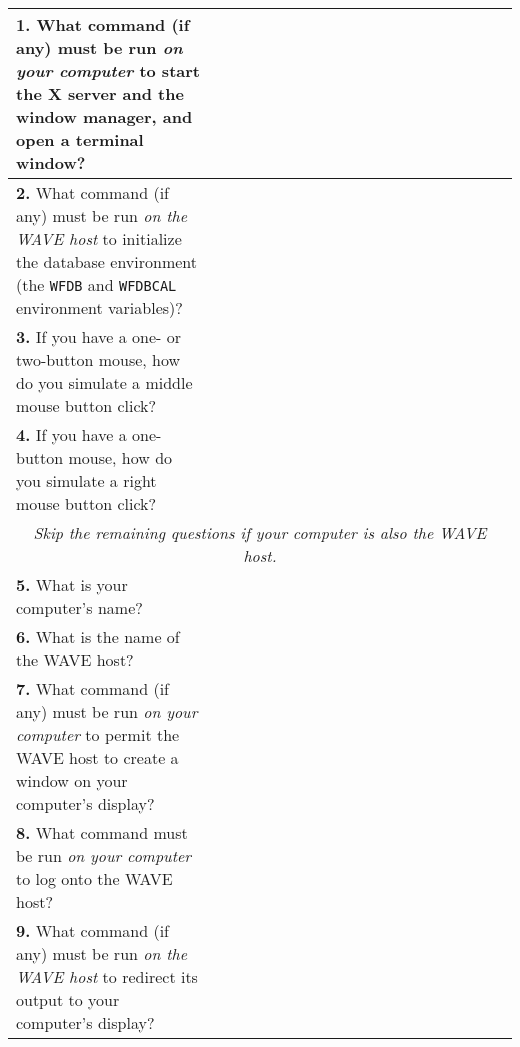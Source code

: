 \documentclass[twoside]{book}
\newcommand{\WAVE}{{\sf WAVE}\xspace}
\begin{document}
\noindent 
\begin{tabular*}{\textwidth}{|p{3 in}|r|}
\hline

{ {\bf 1.} What command (if any) must be run \emph{on your computer}
to start the X server and the window manager, and open a terminal window? } &
{~~~~~~~~~~~~~~~~~~~~~~~~~~~~~~~\,} \\
\hline

{ {\bf 2.} What command (if any) must be run \emph{on the \WAVE{} host} to
initialize the database environment (the {\tt WFDB} and {\tt WFDBCAL}
environment variables)?} &
{~~~~~~~~~~~~~~~~~~~~~~~~~~~~~~~\,} \\
\hline

{ {\bf 3.} If you have a one- or two-button mouse, how do you simulate a middle
mouse button click?} &
{~~~~~~~~~~~~~~~~~~~~~~~~~~~~~~~\,} \\
\hline

{ {\bf 4.} If you have a one-button mouse, how do you simulate a right mouse
button click?} &
{~~~~~~~~~~~~~~~~~~~~~~~~~~~~~~~\,} \\
\hline

\multicolumn{2}{c}{\emph{Skip the remaining questions if your computer is
also the \WAVE{} host.}} \\
\hline

{ {\bf 5.} What is your computer's name?} &
{~~~~~~~~~~~~~~~~~~~~~~~~~~~~~~~\,} \\
\hline

{ {\bf 6.} What is the name of the \WAVE{} host?} &
{~~~~~~~~~~~~~~~~~~~~~~~~~~~~~~~\,} \\
\hline

{ {\bf 7.} What command (if any) must be run \emph{on your computer} to
permit the \WAVE{} host to create a window on your computer's
display?} &
{~~~~~~~~~~~~~~~~~~~~~~~~~~~~~~~\,} \\
\hline

{ {\bf 8.} What command must be run \emph{on your computer} to log onto
the \WAVE{} host?} &
{~~~~~~~~~~~~~~~~~~~~~~~~~~~~~~~\,} \\
\hline

{ {\bf 9.} What command (if any) must be run \emph{on the \WAVE{} host} to redirect its
output to your computer's display?} &
{~~~~~~~~~~~~~~~~~~~~~~~~~~~~~~~\,} \\
\hline

\end{tabular*}
\vspace{5mm}
\end{document}
